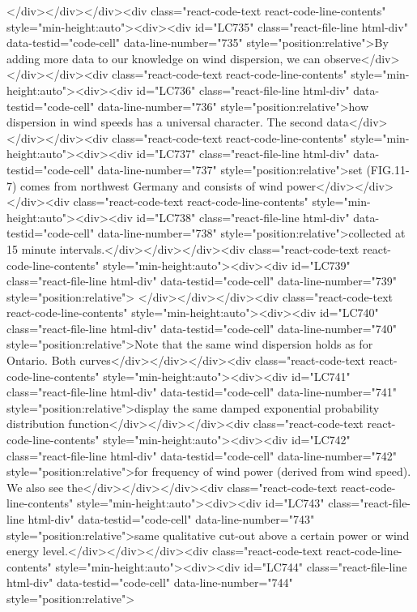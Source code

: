 {{{{{</div></div></div><div class="react-code-text react-code-line-contents" style="min-height:auto"><div><div id="LC735" class="react-file-line html-div" data-testid="code-cell" data-line-number="735" style="position:relative">By adding more data to our knowledge on wind dispersion, we can observe</div></div></div><div class="react-code-text react-code-line-contents" style="min-height:auto"><div><div id="LC736" class="react-file-line html-div" data-testid="code-cell" data-line-number="736" style="position:relative">how dispersion in wind speeds has a universal character. The second data</div></div></div><div class="react-code-text react-code-line-contents" style="min-height:auto"><div><div id="LC737" class="react-file-line html-div" data-testid="code-cell" data-line-number="737" style="position:relative">set (FIG.11-7) comes from northwest Germany and consists of wind power</div></div></div><div class="react-code-text react-code-line-contents" style="min-height:auto"><div><div id="LC738" class="react-file-line html-div" data-testid="code-cell" data-line-number="738" style="position:relative">collected at 15 minute intervals.</div></div></div><div class="react-code-text react-code-line-contents" style="min-height:auto"><div><div id="LC739" class="react-file-line html-div" data-testid="code-cell" data-line-number="739" style="position:relative">
</div></div></div><div class="react-code-text react-code-line-contents" style="min-height:auto"><div><div id="LC740" class="react-file-line html-div" data-testid="code-cell" data-line-number="740" style="position:relative">Note that the same wind dispersion holds as for Ontario. Both curves</div></div></div><div class="react-code-text react-code-line-contents" style="min-height:auto"><div><div id="LC741" class="react-file-line html-div" data-testid="code-cell" data-line-number="741" style="position:relative">display the same damped exponential probability distribution function</div></div></div><div class="react-code-text react-code-line-contents" style="min-height:auto"><div><div id="LC742" class="react-file-line html-div" data-testid="code-cell" data-line-number="742" style="position:relative">for frequency of wind power (derived from wind speed). We also see the</div></div></div><div class="react-code-text react-code-line-contents" style="min-height:auto"><div><div id="LC743" class="react-file-line html-div" data-testid="code-cell" data-line-number="743" style="position:relative">same qualitative cut-out above a certain power or wind energy level.</div></div></div><div class="react-code-text react-code-line-contents" style="min-height:auto"><div><div id="LC744" class="react-file-line html-div" data-testid="code-cell" data-line-number="744" style="position:relative">
}}}}}
